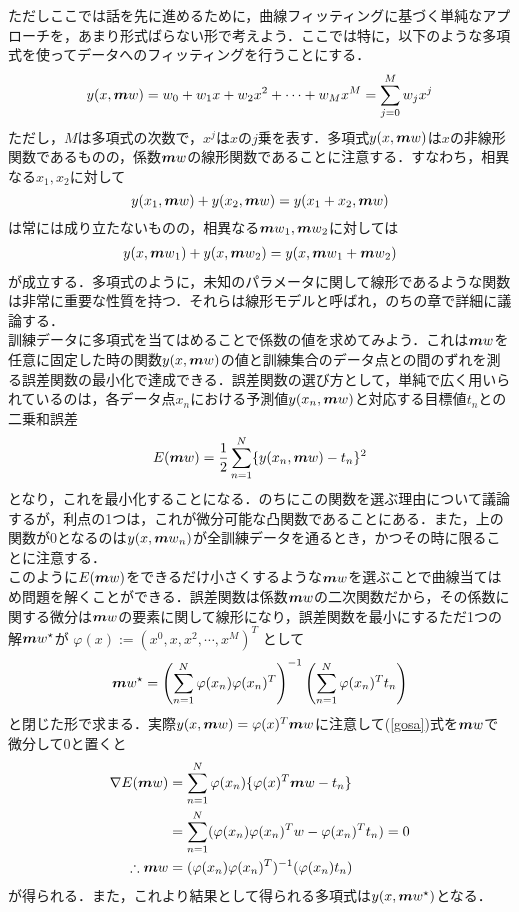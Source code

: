 \documentclass[a4j,11pt]{article}
\newcommand{\bm}{\mbox{\boldmath {$m$}}}
\begin{document}
ただしここでは話を先に進めるために，曲線フィッティングに基づく単純なアプローチを，あまり形式ばらない形で考えよう．ここでは特に，以下のような多項式を使ってデータへのフィッティングを行うことにする．
\begin{equation}
\begin{split}
y(x,{\bm w}) = w_0 + w_1x + w_2x^2 + \cdots + w_Mx^M = \sum_{j=0}^M w_j x^j
\end{split}
\end{equation}
ただし，$M$は多項式の次数で，$x^j$は$x$の$j$乗を表す．多項式$y(x,{\bm w})$は$x$の非線形関数であるものの，係数${\bm w}$の線形関数であることに注意する．すなわち，相異なる$x_1,x_2$に対して
$$y(x_1,{\bm w}) + y(x_2,{\bm w}) = y(x_1+x_2,{\bm w})$$
は常には成り立たないものの，相異なる${\bm w}_1,{\bm w}_2$に対しては
\begin{align*}
  y(x,{\bm w}_1) + y(x,{\bm w}_2) = y(x,{\bm w}_1 + {\bm w}_2)
\end{align*}
が成立する．多項式のように，未知のパラメータに関して線形であるような関数は非常に重要な性質を持つ．それらは線形モデルと呼ばれ，のちの章で詳細に議論する．\\
訓練データに多項式を当てはめることで係数の値を求めてみよう．これは${\bm w}$を任意に固定した時の関数$y(x,{\bm w})$の値と訓練集合のデータ点との間のずれを測る誤差関数の最小化で達成できる．誤差関数の選び方として，単純で広く用いられているのは，各データ点$x_n$における予測値$y(x_n,{\bm w})$と対応する目標値$t_n$との二乗和誤差
\begin{align}
  \label{gosa}
E({\bm w}) = \frac{1}{2}\sum_{n=1}^N\{y(x_n,{\bm w}) - t_n\}^2
\end{align}
となり，これを最小化することになる．のちにこの関数を選ぶ理由について議論するが，利点の1つは，これが微分可能な凸関数であることにある．また，上の関数が$0$となるのは$y(x,{\bm w}_n)$が全訓練データを通るとき，かつその時に限ることに注意する．\\


このように$E({\bm w})$をできるだけ小さくするような$\bm w$を選ぶことで曲線当てはめ問題を解くことができる．誤差関数は係数$\bm w$の二次関数だから，その係数に関する微分は$\bm w$の要素に関して線形になり，誤差関数を最小にするただ1つの解$\bm w^{\star}$が
$\varphi(x) := (x^0 ,x,x^2,\cdots,x^M)^T$
として
\begin{align*}
\bm w^{\star} = \left( \sum_{n=1}^N\varphi(x_n)\varphi(x_n)^T \right)^{-1}\left( \sum_{n=1}^N\varphi(x_n)^T t_n \right)
\end{align*}
と閉じた形で求まる．実際$y(x,\bm w) = \varphi(x)^T \bm w$に注意して(\ref{gosa})式を${\bm w}$で微分して$0$と置くと
\begin{align*}
\nabla E(\bm w) &= \sum_{n=1}^N\varphi(x_n)\{\varphi(x)^T \bm w-t_n\}\\
                &= \sum_{n = 1}^N (\varphi(x_n)\varphi(x_n)^Tw - \varphi(x_n)^T t_n) = 0\\
                \therefore \bm w &= (\varphi(x_n) \varphi(x_n)^T)^{-1}(\varphi(x_n)t_n)
\end{align*}
が得られる．また，これより結果として得られる多項式は$y(x,\bm w^{\star})$となる．\\
\end{document}
